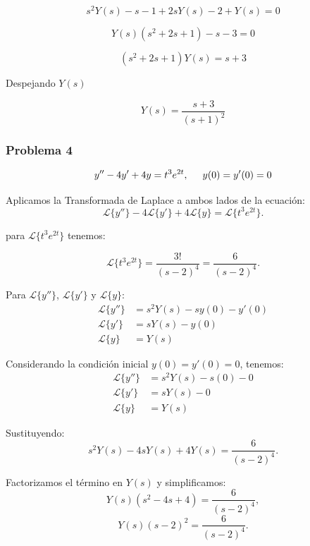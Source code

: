 \documentclass{article}
\begin{document}
\[
    s^2Y(s) - s - 1 + 2sY(s) - 2 + Y(s) = 0
\]

\[
    Y(s)(s^2 + 2s + 1) - s - 3 = 0
\]

\[
    (s^2 + 2s + 1)Y(s) = s + 3
\]

Despejando $Y(s)$

\[
    Y(s) = \frac{s + 3}{(s + 1)^2}
\]

\newpage


\subsubsection{Problema 4}
\[
    y'' - 4y' + 4y = t^{3}e^{2t}, \hspace{.5cm} y(0) = y'(0) = 0
\]

Aplicamos la Transformada de Laplace a ambos lados de la ecuación:
\[
    \mathcal{L}\{y''\} - 4\mathcal{L}\{y'\} + 4\mathcal{L}\{y\} = \mathcal{L}\{t^3e^{2t}\}.
\]

para \(\mathcal{L}\{t^3e^{2t}\}\) tenemos:

\begin{equation*}
    \mathcal{L}\{t^3e^{2t}\} = \frac{3!}{(s-2)^4} = \frac{6}{(s-2)^4}.
\end{equation*}

Para \(\mathcal{L}\{y''\}\), \(\mathcal{L}\{y'\}\) y \(\mathcal{L}\{y\}\):
\begin{align*}
    \mathcal{L}\{y''\} & = s^2Y(s) - sy(0) - y'(0) \\
    \mathcal{L}\{y'\}  & = sY(s) - y(0)            \\
    \mathcal{L}\{y\}   & = Y(s)
\end{align*}

Considerando la condición inicial \(y(0) = y'(0) = 0\), tenemos:
\begin{align*}
    \mathcal{L}\{y''\} & = s^2Y(s) - s(0) - 0 \\
    \mathcal{L}\{y'\}  & = sY(s) - 0          \\
    \mathcal{L}\{y\}   & = Y(s)
\end{align*}

Sustituyendo:
\begin{equation*}
    s^2Y(s) - 4sY(s) + 4Y(s) = \frac{6}{(s-2)^4}.
\end{equation*}

Factorizamos el término en \(Y(s)\) y simplificamos:
\begin{equation*}
    Y(s)(s^2 - 4s + 4) = \frac{6}{(s-2)^4},
\end{equation*}
\begin{equation*}
    Y(s)(s - 2)^2 = \frac{6}{(s-2)^4}.
\end{equation*}
\end{document}
